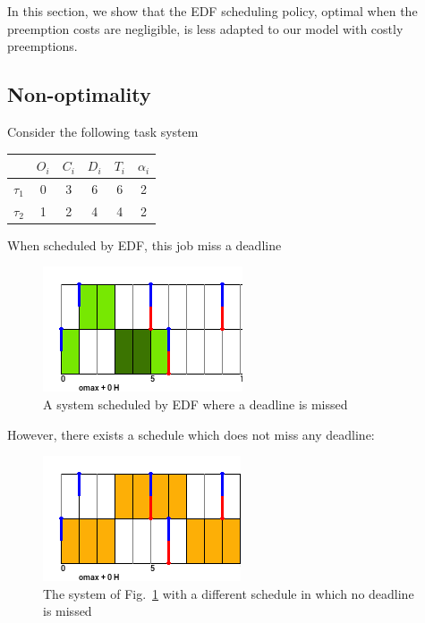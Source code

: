 \documentclass[a4paper,10pt]{article}
\begin{document}
    In this section, we show that the EDF scheduling policy, optimal when the preemption costs are negligible, is less adapted to our model with costly preemptions.

    \subsection{Non-optimality}

        Consider the following task system

        \begin{center}
            \begin{tabular}{|r|c|c|c|c|c|}
                \hline
                            & $O_i$ & $C_i$ & $D_i$ & $T_i$ & $\alpha_i$ \\ \hline
                $\tau_1$    & 0     & 3     & 6    & 6     & 2     \\ \hline
                $\tau_2$    & 1     & 2     & 4    & 4     & 2     \\ \hline
            \end{tabular}
        \end{center}

        When scheduled by EDF, this job miss a deadline\\

        \begin{figure}[H]
        \begin{center}
            \includegraphics{figs/edfNonOptimal_EDF.png}
            \caption{A system scheduled by EDF where a deadline is missed}
            \label{fig:edfnonoptimal_edf}
        \end{center}
        \end{figure}

        However, there exists a schedule which does not miss any deadline:\\

        \begin{figure}[H]
        \begin{center}
            \includegraphics{figs/edfNonOptimal_PALLF.png}
            \caption{The system of Fig.~\ref{fig:edfnonoptimal_edf} with a different schedule in which no deadline is missed}
            \label{fig:edfnonoptimal_pallf}
        \end{center}
        \end{figure}
\end{document}
